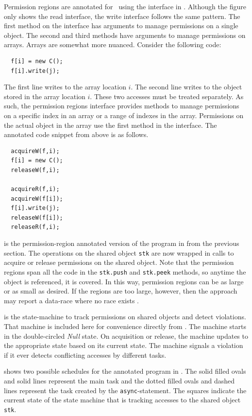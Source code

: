 Permission regions are annotated for \jpf\ using the interface in
. Although the figure only shows the read
interface, the write interface follows the same pattern. The first method on the 
interface has arguments to manage permissions on a single object. The
second and third methods have arguments to manage permissions on
arrays. Arrays are somewhat more nuanced. Consider the following code:
\begin{lstlisting}
  f[i] = new C();
  f[i].write(j);
\end{lstlisting}
The first line writes to the array location $i$. The second line
writes to the object stored in the array location $i$. These two
accesses must be treated separately. As such, the permission regions interface provides
methods to manage permissions on a specific index in an array or a
range of indexes in the array. Permissions on the actual object in the array use the first method in the interface. The annotated code snippet from above is as follows.
\begin{lstlisting}
  acquireW(f,i);
  f[i] = new C();
  releaseW(f,i);
  
  acquireR(f,i);
  acquireW(f[i]);
  f[i].write(j);
  releaseW(f[i]);
  releaseR(f,i);
\end{lstlisting}

 is the permission-region annotated
version of the program in  from the
previous section. The operations on the shared object \texttt{stk} are
now wrapped in calls to acquire or release permissions on the shared
object. Note that the permission regions span all the code 
in the \texttt{stk.push} and \texttt{stk.peek} methods, so anytime the object is referenced, it is covered. In this
way, permission regions can be as large or as small as desired. If the
regions are too large, however, then the approach may report a data-race
where no race exists
\cite{Westbrook:2011:PRR:2341616.2341627,hj-grad-perm}. 

 is the state-machine to track
permissions on shared objects and detect violations. That machine is included here for convenience directly
from \cite{hj-grad-perm}. The machine starts in the double-circled
\textit{Null} state. On acquisition or release, the machine updates to
the appropriate state based on its current state. The machine signals
a violation if it ever detects conflicting accesses by different tasks.

 shows two possible schedules
for the annotated program in . The solid
filled ovals and solid lines represent the main task and the dotted
filled ovals and dashed lines represent the task created by the
\texttt{async}-statement. The squares indicate the current state of
the state machine that is tracking accesses to the shared object
\texttt{stk}.

